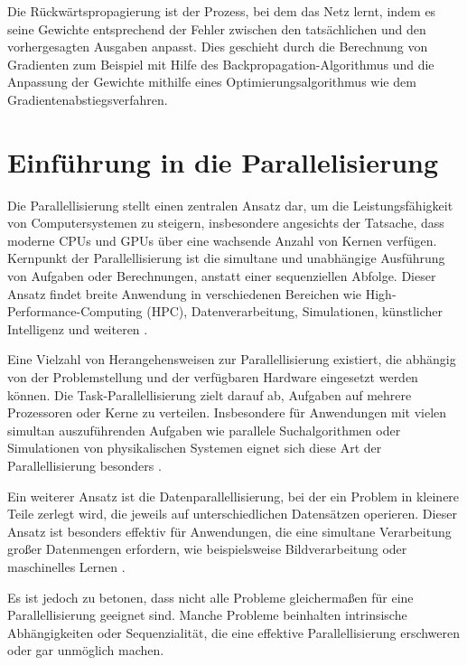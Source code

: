 Die Rückwärtspropagierung ist der Prozess, bei dem das Netz lernt, indem es seine Gewichte entsprechend der Fehler zwischen den tatsächlichen und den vorhergesagten Ausgaben anpasst. Dies geschieht durch die Berechnung von Gradienten zum Beispiel mit Hilfe des Backpropagation-Algorithmus \citep{thesis_Artur_Brening} und die Anpassung der Gewichte mithilfe eines Optimierungsalgorithmus wie dem Gradientenabstiegsverfahren.

\section{Einführung in die Parallelisierung}
\label{sec:Grundlagen_Parallelisierung}
Die Parallellisierung stellt einen zentralen Ansatz dar, um die Leistungsfähigkeit von Computersystemen zu steigern, insbesondere angesichts der Tatsache, dass moderne CPUs und GPUs über eine wachsende Anzahl von Kernen verfügen. Kernpunkt der Parallellisierung ist die simultane und unabhängige Ausführung von Aufgaben oder Berechnungen, anstatt einer sequenziellen Abfolge. Dieser Ansatz findet breite Anwendung in verschiedenen Bereichen wie High-Performance-Computing (HPC), Datenverarbeitung, Simulationen, künstlicher Intelligenz und weiteren \citep{Flynn_Computer_Organizations_and_their_Effectiveness}.

Eine Vielzahl von Herangehensweisen zur Parallellisierung existiert, die abhängig von der Problemstellung und der verfügbaren Hardware eingesetzt werden können. Die Task-Parallellisierung zielt darauf ab, Aufgaben auf mehrere Prozessoren oder Kerne zu verteilen. Insbesondere für Anwendungen mit vielen simultan auszuführenden Aufgaben wie parallele Suchalgorithmen oder Simulationen von physikalischen Systemen eignet sich diese Art der Parallellisierung besonders \citep{Flynn_Computer_Organizations_and_their_Effectiveness}.

Ein weiterer Ansatz ist die Datenparallellisierung, bei der ein Problem in kleinere Teile zerlegt wird, die jeweils auf unterschiedlichen Datensätzen operieren. Dieser Ansatz ist besonders effektiv für Anwendungen, die eine simultane Verarbeitung großer Datenmengen erfordern, wie beispielsweise Bildverarbeitung oder maschinelles Lernen \citep{Flynn_Computer_Organizations_and_their_Effectiveness}.

Es ist jedoch zu betonen, dass nicht alle Probleme gleichermaßen für eine Parallellisierung geeignet sind. Manche Probleme beinhalten intrinsische Abhängigkeiten oder Sequenzialität, die eine effektive Parallellisierung erschweren oder gar unmöglich machen.

